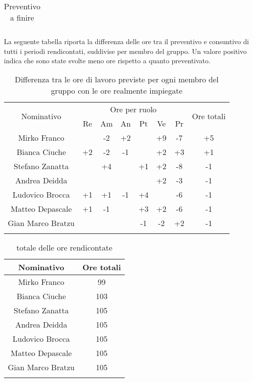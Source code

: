 \begin{flushleft}
\begin{table}[H]
\begin{center}
\begin{tabular}{ccc}
			\end{tabular}
			\caption{Preventivo a finire} 
		\end{center}		
	\end{table}
	La seguente tabella riporta la differenza delle ore tra il preventivo e consuntivo di tutti i periodi rendicontati, suddivise per membro del gruppo. Un valore positivo indica che sono state svolte meno ore rispetto a quanto preventivato.
	\begin{longtable}{|c|cccccc|c|}
				\hline
				\multirow{2}{*}{Nominativo} & \multicolumn{6}{c|}{Ore per ruolo} & \multirow{2}{*}{Ore totali} \\ \cline{2-7}
				& Re & Am & An & Pt & Ve & Pr &      \\ \hline
				\endhead
				Mirko Franco       &   & -2 &   +2 &    & +9 & -7 & +5  \\ \hline
				Bianca Ciuche      & +2  &  -2 & -1  &    &  +2 &  +3 & +1       \\ \hline
				Stefano Zanatta    &   & +4 &    & +1  & +2 & -8   &  -1      \\ \hline
				Andrea Deidda      &   & &   &   & +2  & -3 & -1  		\\ \hline
				Ludovico Brocca    & +1  &+1  & -1  & +4   &   & -6  & -1        \\ \hline
				Matteo Depascale   &  +1 & -1 &  & +3 &  +2 & -6  & -1	\\ \hline
				Gian Marco Bratzu  & &  &   & -1  & -2 & +2  & -1        \\ \hline
				
			\caption{Differenza tra le ore di lavoro previste per ogni membro del gruppo con le ore realmente impiegate }
	\end{longtable}

	\begin{longtable}{|c|c|}
		\hline
		\textbf{Nominativo} & \textbf{Ore totali} \\ \hline
		\endhead  
		Mirko Franco       &  99     \\ \hline
		Bianca Ciuche      &  103         \\ \hline
		Stefano Zanatta    &  105      \\ \hline
		Andrea Deidda      &  105  		\\ \hline
		Ludovico Brocca    &  105    \\ \hline
		Matteo Depascale   & 	105	\\ \hline
		Gian Marco Bratzu  &  105     \\ \hline
	
	\caption{totale delle ore rendicontate}
\end{longtable}
\end{flushleft}